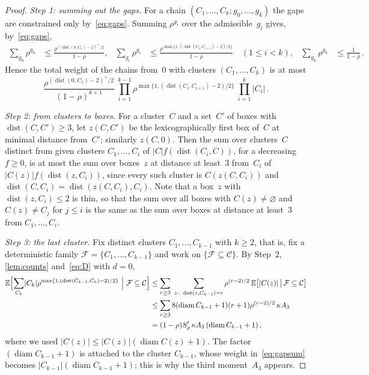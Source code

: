 \documentclass[11pt,letterpaper]{article}
\DeclareMathOperator{\diam}{diam}
\DeclareMathOperator{\dist}{dist}
\begin{document}
\begin{proof}
\emph{Step 1: summing out the gaps.} For a chain $(C_1,\dots,C_k;g_0,\dots,g_k)$ the gaps are constrained only by~\eqref{eq:gaps}. Summing $\rho^{g_i}$ over the admissible~$g_i$ gives, by~\eqref{eq:gaps},
\begin{align*}
  \sum_{g_0}\rho^{g_0}&\le\frac{\rho^{(\dist(0,C_1)-2)^+/2}}{1-\rho},&
  \sum_{g_i}\rho^{g_i}&\le\frac{\rho^{\max\{1,(\dist(C_i,C_{i+1})-2)/2\}}}{1-\rho}\quad(1\le i<k),&\sum_{g_k}\rho^{g_k}&\le\frac1{1-\rho}\,.
\end{align*}
Hence the total weight of the chains from~$0$ with clusters $(C_1,\dots,C_k)$ is at most
\begin{equation}
\label{eq:gapsum}
  \frac{\rho^{(\dist(0,C_1)-2)^+/2}}{(1-\rho)^{k+1}}\ \prod_{i=1}^{k-1}\rho^{\max\{1,(\dist(C_i,C_{i+1})-2)/2\}}\ \prod_{i=1}^k\lvert C_i\rvert\,.
\end{equation}

\emph{Step 2: from clusters to boxes.} For a cluster~$C$ and a set~$C'$ of boxes with $\dist(C,C')\ge3$, let $z(C,C')$ be the lexicographically first box of~$C$ at minimal distance from~$C'$; similarly $z(C,0)$. Then the sum over clusters~$C$ distinct from given clusters $C_1,\dots,C_{i}$ of $\lvert C\rvert f(\dist(C_i,C))$, for a decreasing $f\ge0$, is at most the sum over boxes~$z$ at distance at least~$3$ from~$C_i$ of $\lvert C(z)\rvert f(\dist(z,C_i))$, since every such cluster is $C(z(C,C_i))$ and $\dist(C,C_i)=\dist(z(C,C_i),C_i)$. Note that a box~$z$ with $\dist(z,C_i)\le2$ is thin, so that the sum over all boxes with $C(z)\neq\varnothing$ and $C(z)\ne C_j$ for $j\le i$ is the same as the sum over boxes at distance at least~$3$ from $C_1,\dots,C_i$.

\emph{Step 3: the last cluster.} Fix distinct clusters $C_1,\dots,C_{k-1}$ with $k\ge2$, that is, fix a deterministic family $\mathcal F=\{C_1,\dots,C_{k-1}\}$ and work on $\{\mathcal F\subseteq\mathcal C\}$. By Step~2, \cref{lem:counts} and~\eqref{eq:D} with $d=0$,
\begin{align*}
  \E\Bigl[\sum_{C_k}\lvert C_k\rvert\rho^{\max\{1,(\dist(C_{k-1},C_k)-2)/2\}}\ \Big\vert\ \mathcal F\subseteq\mathcal C\Bigr]
  &\le\sum_{r\ge3}\ \sum_{z\colon\dist(z,C_{k-1})=r}\rho^{(r-2)/2}\,\E\bigl[\lvert C(z)\rvert\,\big\vert\,\mathcal F\subseteq\mathcal C\bigr]\\
  &\le\sum_{r\ge3}8(\diam C_{k-1}+1)(r+1)\rho^{(r-2)/2}\,\kappa A_3\\
  &=(1-\rho)S'_\rho\,\kappa A_3\,(\diam C_{k-1}+1)\,,
\end{align*}
where we used $\lvert C(z)\rvert\le\lvert C(z)\rvert(\diam C(z)+1)$. The factor $(\diam C_{k-1}+1)$ is attached to the cluster $C_{k-1}$, whose weight in~\eqref{eq:gapsum} becomes $\lvert C_{k-1}\rvert(\diam C_{k-1}+1)$; this is why the third moment~$A_3$ appears.


\end{proof}
\end{document}
